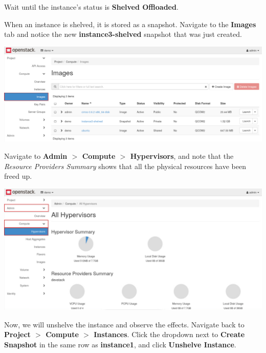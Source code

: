\documentclass[letterpaper, 12pt]{article}
\begin{document}
\begin{enumerate}
    \begin{stopbox}
        Wait until the instance's status is \textbf{Shelved Offloaded}.
    \end{stopbox}

    \begin{labstep}
        When an instance is shelved, it is stored as a snapshot.
        Navigate to the \textbf{Images} tab and notice the new \textbf{instance3-shelved} snapshot that was just created.

        \begin{center}
            \includegraphics[width=\linewidth]{images/part5/step11.png}
        \end{center}
    \end{labstep}

    \begin{labstep}
        Navigate to \textbf{Admin $>$ Compute $>$ Hypervisors}, and note that the \textit{Resource Providers Summary} shows that all the physical resources have been freed up.

        \begin{center}
            \includegraphics[width=\linewidth]{images/part5/step12.png}
        \end{center}
    \end{labstep}

    \begin{labstep}
        Now, we will unshelve the instance and observe the effects.
        Navigate back to \textbf{Project $>$ Compute $>$ Instances}.
        Click the dropdown next to \textbf{Create Snapshot} in the same row as \textbf{instance1}, and click \textbf{Unshelve Instance}.


\end{labstep}
\end{enumerate}
\end{document}
